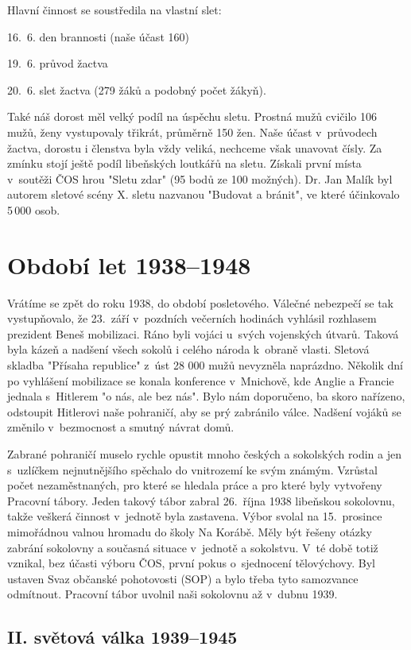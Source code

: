 \documentclass[a5paper, 11pt, twoside]{article}
\begin{document}
\medskip
Hlavní činnost se soustředila na vlastní slet:
\medskip

16.~6. den brannosti (naše účast 160)

19.~6. průvod žactva

20.~6. slet žactva (279 žáků a podobný počet žákyň).

\medskip
Také náš dorost měl velký podíl na úspěchu sletu. Prostná mužů cvičilo
106 mužů, ženy vystupovaly třikrát, průměrně 150 žen. Naše účast
v~průvodech žactva, dorostu i členstva byla vždy veliká, nechceme však
unavovat čísly. Za zmínku stojí ještě podíl libeňských loutkářů na
sletu. Získali první místa v~soutěži ČOS hrou "Sletu zdar" (95 bodů ze
100 možných). Dr. Jan Malík byl autorem sletové scény X. sletu nazvanou
"Budovat a bránit", ve které účinkovalo 5\,000 osob.

\section{Období let 1938--1948}

Vrátíme se zpět do roku 1938, do období posletového. Válečné nebezpečí
se tak vystupňovalo, že 23.~září v~pozdních večerních hodinách vyhlásil
rozhlasem prezident Beneš mobilizaci. Ráno byli vojáci u~svých
vojenských útvarů. Taková byla kázeň a nadšení všech sokolů i celého
národa k~obraně vlasti. Sletová skladba "Přísaha republice" z~úst 28
000 mužů nevyzněla naprázdno. Několik dní po vyhlášení mobilizace se
konala konference v~Mnichově, kde Anglie a Francie jednala s~Hitlerem "o
nás, ale bez nás". Bylo nám doporučeno, ba skoro nařízeno, odstoupit
Hitlerovi naše pohraničí, aby se prý zabránilo válce. Nadšení vojáků se
změnilo v~bezmocnost a smutný návrat domů.

Zabrané pohraničí muselo rychle opustit mnoho českých a sokolských rodin
a jen s~uzlíčkem nejnutnějšího spěchalo do vnitrozemí ke svým známým.
Vzrůstal počet nezaměstnaných, pro které se hledala práce a pro které
byly vytvořeny Pracovní tábory. Jeden takový tábor zabral 26.~října 1938
libeňskou sokolovnu, takže veškerá činnost v~jednotě byla zastavena.
Výbor svolal na 15.~prosince mimořádnou valnou hromadu do školy Na
Korábě. Měly být řešeny otázky zabrání sokolovny a současná situace
v~jednotě a sokolstvu. V~té době totiž vznikal, bez účasti výboru ČOS,
první pokus o~sjednocení tělovýchovy. Byl ustaven Svaz občanské
pohotovosti (SOP) a bylo třeba tyto samozvance odmítnout. Pracovní tábor
uvolnil naši sokolovnu až v~dubnu 1939.

\subsection{II. světová válka 1939--1945}
\end{document}
